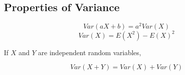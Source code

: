 \subsection{Properties of Variance} %
\label{sub:properties_of_variance}
\begin{equation}
  Var(aX + b) = a^2Var(X)
\end{equation}
\begin{equation}
  Var(X) = E(X^2) - E(X)^2
\end{equation}

If $X$ and $Y$ are independent random variables,

\begin{equation}
  Var(X+Y) = Var(X) + Var(Y)
\end{equation}

